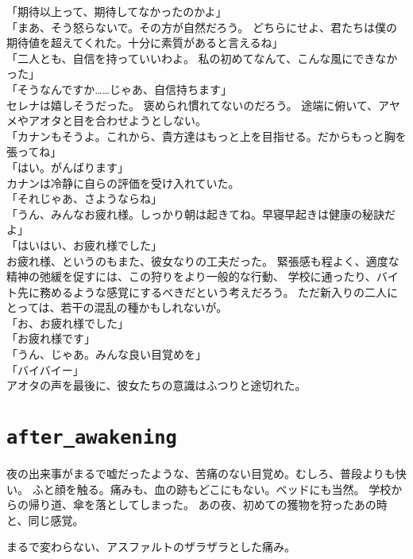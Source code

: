 \documentclass[../IHMain]{subfiles}
\begin{document}
「期待以上って、期待してなかったのかよ」\\
「まあ、そう怒らないで。その方が自然だろう。
どちらにせよ、君たちは僕の期待値を超えてくれた。十分に素質があると言えるね」\\
「二人とも、自信を持っていいわよ。
私の初めてなんて、こんな風にできなかった」\\
「そうなんですか……じゃあ、自信持ちます」\\
セレナは嬉しそうだった。
褒められ慣れてないのだろう。
途端に俯いて、アヤメやアオタと目を合わせようとしない。\\
「カナンもそうよ。これから、貴方達はもっと上を目指せる。だからもっと胸を張ってね」\\
「はい。がんばります」\\

カナンは冷静に自らの評価を受け入れていた。\\
「それじゃあ、さようならね」\\
「うん、みんなお疲れ様。しっかり朝は起きてね。早寝早起きは健康の秘訣だよ」\\
「はいはい、お疲れ様でした」\\
お疲れ様、というのもまた、彼女なりの工夫だった。
緊張感も程よく、適度な精神の弛緩を促すには、この狩りをより一般的な行動、
学校に通ったり、バイト先に務めるような感覚にするべきだという考えだろう。
ただ新入りの二人にとっては、若干の混乱の種かもしれないが。\\
「お、お疲れ様でした」\\
「お疲れ様です」\\
「うん、じゃあ。みんな良い目覚めを」\\
「バイバイー」\\
アオタの声を最後に、彼女たちの意識はふつりと途切れた。

\newpage
\section*{\tt after\_awakening}
夜の出来事がまるで嘘だったような、苦痛のない目覚め。むしろ、普段よりも快い。
ふと顔を触る。痛みも、血の跡もどこにもない。ベッドにも当然。
学校からの帰り道、傘を落としてしまった。
あの夜、初めての獲物を狩ったあの時と、同じ感覚。

まるで変わらない、アスファルトのザラザラとした痛み。
\end{document}
